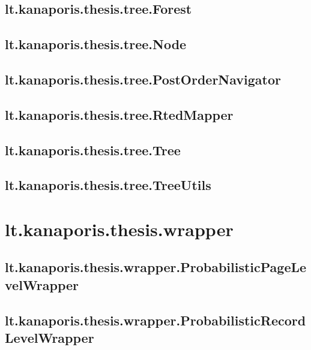 \subsection{lt.kanaporis.thesis.tree.Forest}


\subsection{lt.kanaporis.thesis.tree.Node}


\subsection{lt.kanaporis.thesis.tree.PostOrderNavigator}


\subsection{lt.kanaporis.thesis.tree.RtedMapper}


\subsection{lt.kanaporis.thesis.tree.Tree}


\subsection{lt.kanaporis.thesis.tree.TreeUtils}



\section{lt.kanaporis.thesis.wrapper}

\subsection{lt.kanaporis.thesis.wrapper.ProbabilisticPageLevelWrapper}


\subsection{lt.kanaporis.thesis.wrapper.ProbabilisticRecordLevelWrapper}



